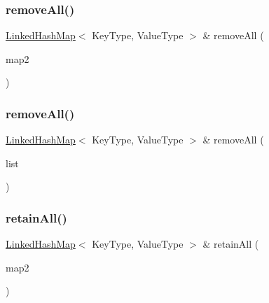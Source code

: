 \subsubsection{\texorpdfstring{remove\+All()}{removeAll()}\hspace{0.1cm}{\footnotesize\ttfamily [1/2]}}
{\footnotesize\ttfamily \mbox{\hyperlink{classLinkedHashMap}{Linked\+Hash\+Map}}$<$ Key\+Type, Value\+Type $>$ \& remove\+All (\begin{DoxyParamCaption}\item[{const \mbox{\hyperlink{classLinkedHashMap}{Linked\+Hash\+Map}}$<$ Key\+Type, Value\+Type $>$ \&}]{map2 }\end{DoxyParamCaption})}

\mbox{\label{classLinkedHashMap_aa3c3540443fba343b0e8ecfea1ce14b1}} 
\subsubsection{\texorpdfstring{remove\+All()}{removeAll()}\hspace{0.1cm}{\footnotesize\ttfamily [2/2]}}
{\footnotesize\ttfamily \mbox{\hyperlink{classLinkedHashMap}{Linked\+Hash\+Map}}$<$ Key\+Type, Value\+Type $>$ \& remove\+All (\begin{DoxyParamCaption}\item[{std\+::initializer\+\_\+list$<$ std\+::pair$<$ Key\+Type, Value\+Type $>$ $>$}]{list }\end{DoxyParamCaption})}

\mbox{\label{classLinkedHashMap_a9bcc3af0a0717671f5bf22f2c886f7ff}} 
\subsubsection{\texorpdfstring{retain\+All()}{retainAll()}\hspace{0.1cm}{\footnotesize\ttfamily [1/2]}}
{\footnotesize\ttfamily \mbox{\hyperlink{classLinkedHashMap}{Linked\+Hash\+Map}}$<$ Key\+Type, Value\+Type $>$ \& retain\+All (\begin{DoxyParamCaption}\item[{const \mbox{\hyperlink{classLinkedHashMap}{Linked\+Hash\+Map}}$<$ Key\+Type, Value\+Type $>$ \&}]{map2 }\end{DoxyParamCaption})}

